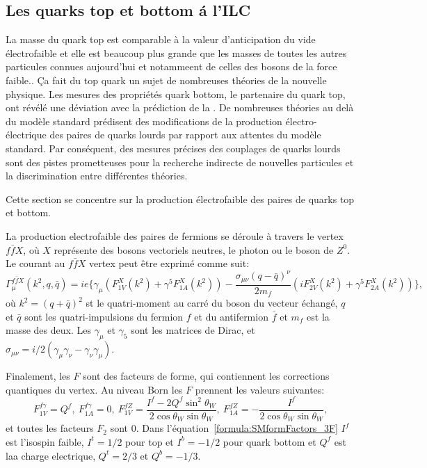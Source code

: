 \subsection*{Les quarks top et bottom \'a l'ILC}

La masse du quark top est comparable à la valeur d'anticipation du vide électrofaible et elle est beaucoup plus grande que les masses de toutes les autres particules connues aujourd'hui et notammeent de celles des bosons de la force faible..
\c Ca fait du top quark un sujet de nombreuses théories de la nouvelle physique.
Les mesures des propriétés quark bottom, le partenaire du quark top, ont révélé une déviation avec la prédiction de la \sm.
De nombreuses théories au delà du modèle standard prédisent des modifications de la production électro-électrique des paires de quarks lourds par rapport aux attentes du modèle standard.
Par conséquent, des mesures précises des couplages de quarks lourds sont des pistes prometteuses pour la recherche indirecte de nouvelles particules et la discrimination entre différentes théories.

Cette section se concentre sur la production électrofaible des paires de quarks top et bottom.

La production electrofaible des paires de fermions se déroule à travers le vertex $f\bar{f}X$, où $X$ représente des bosons vectoriels neutres, le photon ou le boson de $Z^0$. Le courant au $f\bar{f}X$ vertex peut être exprimé comme suit:
\begin{equation}
\Gamma^{f\bar{f}X}_\mu (k^2,q,\bar{q}) = ie\{ \gamma_\mu (F^X_{1V}(k^2) + \gamma^5 F^X_{1A}(k^2)) - \frac{\sigma_{\mu\nu}(q-\bar{q})^\nu}{2m_f}(iF^X_{2V}(k^2) + \gamma^5 F^X_{2A}(k^2)) \},
\end{equation}
où $k^2= (q+\bar{q})^2$ st le quatri-moment au carré du boson du vecteur échangé, $q$ et $\bar{q} $ sont les quatri-impulsions du fermion $f$ et du antifermion $\bar{f}$ et $m_f$ est la masse des deux. Les $\gamma_\mu$ et $\gamma_5$ sont les matrices de Dirac, et $\sigma_{\mu\nu} = i/2(\gamma_\mu\gamma_\nu - \gamma_\nu\gamma_\mu)$.

Finalement, les $F$ sont des facteurs de forme, qui contiennent les corrections quantiques du vertex. Au niveau Born les $F$ prennent les valeurs suivantes:  
\begin{equation}
F^{f\gamma}_{1V} = Q^{f}, \ F^{f\gamma}_{1A} = 0, \ F^{fZ}_{1V} = \frac{I^f - 2Q^f\sin^2\theta_W}{2\cos\theta_W\sin\theta_W}, \ F^{fZ}_{1A} = - \frac{I^f}{2\cos\theta_W\sin\theta_W},
\label{formula:SMformFactors_3F}
\end{equation}
et toutes les facteurs $F_2$ sont 0. Dans l'équation~\ref{formula:SMformFactors_3F} $I^f$ est  l'isospin faible, $I^t = 1/2$ pour top et $I^b = -1/2$ pour quark bottom  et $Q^f$ est laa charge electrique, $Q^t = 2/3$ et $Q^b = -1/3$.


